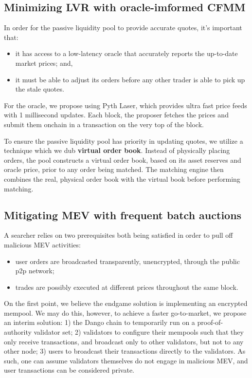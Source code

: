 \documentclass{article}
\begin{document}
\subsection{Minimizing LVR with oracle-imformed CFMM}

In order for the passive liquidity pool to provide accurate quotes, it's important that:

\begin{itemize}
  \item it has access to a low-latency oracle that accurately reports the up-to-date market prices; and,
  \item it must be able to adjust its orders before any other trader is able to pick up the stale quotes.
\end{itemize}

For the oracle, we propose using Pyth Laser,\supercite{pythlaser} which provides ultra fast price feeds with 1 millisecond updates. Each block, the proposer fetches the prices and submit them onchain in a transaction on the very top of the block.

To ensure the passive liquidity pool has priority in updating quotes, we utilize a technique which we dub \textbf{virtual order book}. Instead of physically placing orders, the pool constructs a virtual order book, based on its asset reserves and oracle price, prior to any order being matched. The matching engine then combines the real, physical order book with the virtual book before performing matching.

\subsection{Mitigating MEV with frequent batch auctions}

A searcher relies on two prerequisites both being satisfied in order to pull off malicious MEV activities:

\begin{itemize}
  \item user orders are broadcasted transparently, unencrypted, through the public p2p network;
  \item trades are possibly executed at different prices throughout the same block.
\end{itemize}

On the first point, we believe the endgame solution is implementing an encrypted mempool.\supercite{encryptedmempool} We may do this, however, to achieve a faster go-to-market, we propose an interim solution: 1) the Dango chain to temporarily run on a proof-of-authority validator set; 2) validators to configure their mempools such that they only receive transactions, and broadcast only to other validators, but not to any other node; 3) users to broadcast their transactions directly to the validators. As such, one can assume validators themselves do not engage in malicious MEV, and user transactions can be considered private.
\end{document}
